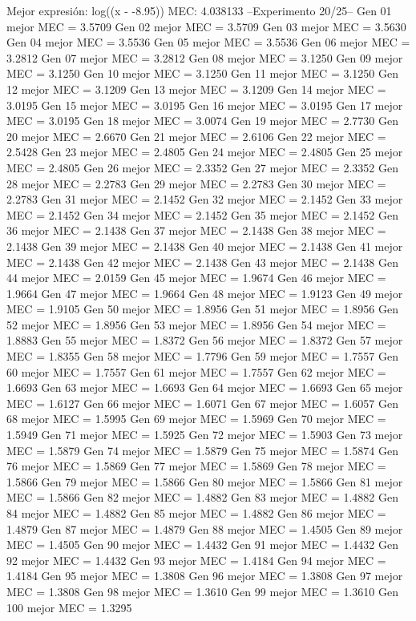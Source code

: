 Mejor expresión: log((x - -8.95))
MEC: 4.038133
--Experimento 
 20/25--
Gen 01 mejor MEC = 3.5709
Gen 02 mejor MEC = 3.5709
Gen 03 mejor MEC = 3.5630
Gen 04 mejor MEC = 3.5536
Gen 05 mejor MEC = 3.5536
Gen 06 mejor MEC = 3.2812
Gen 07 mejor MEC = 3.2812
Gen 08 mejor MEC = 3.1250
Gen 09 mejor MEC = 3.1250
Gen 10 mejor MEC = 3.1250
Gen 11 mejor MEC = 3.1250
Gen 12 mejor MEC = 3.1209
Gen 13 mejor MEC = 3.1209
Gen 14 mejor MEC = 3.0195
Gen 15 mejor MEC = 3.0195
Gen 16 mejor MEC = 3.0195
Gen 17 mejor MEC = 3.0195
Gen 18 mejor MEC = 3.0074
Gen 19 mejor MEC = 2.7730
Gen 20 mejor MEC = 2.6670
Gen 21 mejor MEC = 2.6106
Gen 22 mejor MEC = 2.5428
Gen 23 mejor MEC = 2.4805
Gen 24 mejor MEC = 2.4805
Gen 25 mejor MEC = 2.4805
Gen 26 mejor MEC = 2.3352
Gen 27 mejor MEC = 2.3352
Gen 28 mejor MEC = 2.2783
Gen 29 mejor MEC = 2.2783
Gen 30 mejor MEC = 2.2783
Gen 31 mejor MEC = 2.1452
Gen 32 mejor MEC = 2.1452
Gen 33 mejor MEC = 2.1452
Gen 34 mejor MEC = 2.1452
Gen 35 mejor MEC = 2.1452
Gen 36 mejor MEC = 2.1438
Gen 37 mejor MEC = 2.1438
Gen 38 mejor MEC = 2.1438
Gen 39 mejor MEC = 2.1438
Gen 40 mejor MEC = 2.1438
Gen 41 mejor MEC = 2.1438
Gen 42 mejor MEC = 2.1438
Gen 43 mejor MEC = 2.1438
Gen 44 mejor MEC = 2.0159
Gen 45 mejor MEC = 1.9674
Gen 46 mejor MEC = 1.9664
Gen 47 mejor MEC = 1.9664
Gen 48 mejor MEC = 1.9123
Gen 49 mejor MEC = 1.9105
Gen 50 mejor MEC = 1.8956
Gen 51 mejor MEC = 1.8956
Gen 52 mejor MEC = 1.8956
Gen 53 mejor MEC = 1.8956
Gen 54 mejor MEC = 1.8883
Gen 55 mejor MEC = 1.8372
Gen 56 mejor MEC = 1.8372
Gen 57 mejor MEC = 1.8355
Gen 58 mejor MEC = 1.7796
Gen 59 mejor MEC = 1.7557
Gen 60 mejor MEC = 1.7557
Gen 61 mejor MEC = 1.7557
Gen 62 mejor MEC = 1.6693
Gen 63 mejor MEC = 1.6693
Gen 64 mejor MEC = 1.6693
Gen 65 mejor MEC = 1.6127
Gen 66 mejor MEC = 1.6071
Gen 67 mejor MEC = 1.6057
Gen 68 mejor MEC = 1.5995
Gen 69 mejor MEC = 1.5969
Gen 70 mejor MEC = 1.5949
Gen 71 mejor MEC = 1.5925
Gen 72 mejor MEC = 1.5903
Gen 73 mejor MEC = 1.5879
Gen 74 mejor MEC = 1.5879
Gen 75 mejor MEC = 1.5874
Gen 76 mejor MEC = 1.5869
Gen 77 mejor MEC = 1.5869
Gen 78 mejor MEC = 1.5866
Gen 79 mejor MEC = 1.5866
Gen 80 mejor MEC = 1.5866
Gen 81 mejor MEC = 1.5866
Gen 82 mejor MEC = 1.4882
Gen 83 mejor MEC = 1.4882
Gen 84 mejor MEC = 1.4882
Gen 85 mejor MEC = 1.4882
Gen 86 mejor MEC = 1.4879
Gen 87 mejor MEC = 1.4879
Gen 88 mejor MEC = 1.4505
Gen 89 mejor MEC = 1.4505
Gen 90 mejor MEC = 1.4432
Gen 91 mejor MEC = 1.4432
Gen 92 mejor MEC = 1.4432
Gen 93 mejor MEC = 1.4184
Gen 94 mejor MEC = 1.4184
Gen 95 mejor MEC = 1.3808
Gen 96 mejor MEC = 1.3808
Gen 97 mejor MEC = 1.3808
Gen 98 mejor MEC = 1.3610
Gen 99 mejor MEC = 1.3610
Gen 100 mejor MEC = 1.3295

